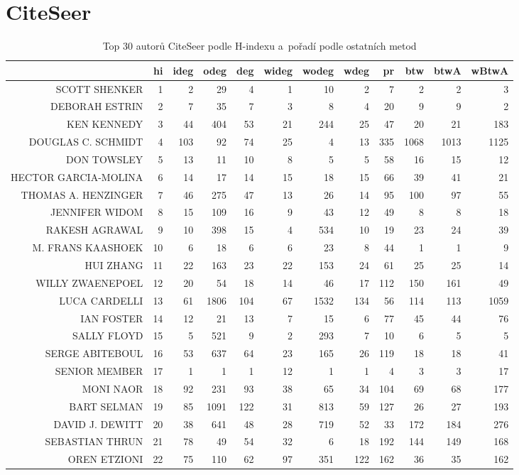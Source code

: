 \documentclass{bakalarka}
\begin{document}
\section{CiteSeer}
\begin{table}[!ht]
\centering
\caption{Top 30 autorů CiteSeer podle H-indexu a~pořadí podle ostatních metod}
\label{tab:ranks3}
\begin{sideways}
\begin{scriptsize}
\begin{tabular}{r|r|rrrrrrrrrr}
\toprule
&hi&ideg&odeg&deg&wideg&wodeg&wdeg&pr&btw&btwA&wBtwA\\
\midrule
SCOTT SHENKER&1&2&29&4&1&10&2&7&2&2&3\\
DEBORAH ESTRIN&2&7&35&7&3&8&4&20&9&9&2\\
KEN KENNEDY&3&44&404&53&21&244&25&47&20&21&183\\
DOUGLAS C. SCHMIDT&4&103&92&74&25&4&13&335&1068&1013&1125\\
DON TOWSLEY&5&13&11&10&8&5&5&58&16&15&12\\
HECTOR GARCIA-MOLINA&6&14&17&14&15&18&15&66&39&41&21\\
THOMAS A. HENZINGER&7&46&275&47&13&26&14&95&100&97&55\\
JENNIFER WIDOM&8&15&109&16&9&43&12&49&8&8&18\\
RAKESH AGRAWAL&9&10&398&15&4&534&10&19&23&24&39\\
M. FRANS KAASHOEK&10&6&18&6&6&23&8&44&1&1&9\\
HUI ZHANG&11&22&163&23&22&153&24&61&25&25&14\\
WILLY ZWAENEPOEL&12&20&54&18&14&46&17&112&150&161&49\\
LUCA CARDELLI&13&61&1806&104&67&1532&134&56&114&113&1059\\
IAN FOSTER&14&12&21&13&7&15&6&77&45&44&76\\
SALLY FLOYD&15&5&521&9&2&293&7&10&6&5&5\\
SERGE ABITEBOUL&16&53&637&64&23&165&26&119&18&18&41\\
SENIOR MEMBER&17&1&1&1&12&1&1&4&3&3&17\\
MONI NAOR&18&92&231&93&38&65&34&104&69&68&177\\
BART SELMAN&19&85&1091&122&31&813&59&127&26&27&193\\
DAVID J. DEWITT&20&38&641&48&28&719&52&33&172&184&276\\
SEBASTIAN THRUN&21&78&49&54&32&6&18&192&144&149&168\\
OREN ETZIONI&22&75&110&62&97&351&122&162&36&35&162\\

\end{tabular}
\end{scriptsize}
\end{sideways}
\end{table}
\end{document}
